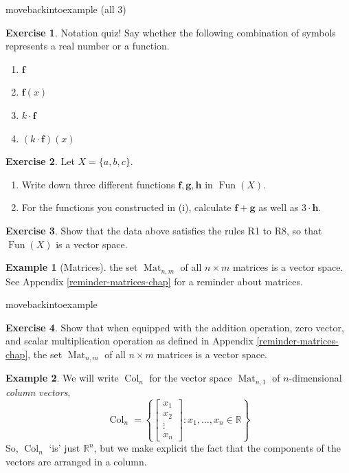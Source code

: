 \documentclass[a4paper,11pt]{book}
\theoremstyle{definition}
\newtheorem{exercise}{Exercise}
\newtheorem{example_environment}{Example}[chapter]
\newenvironment{example}
	{
		\begin{oframed} 
		\begin{example_environment}
	}
	{
		\end{example_environment}
		\end{oframed}
	}
\DeclareMathOperator{\Fun}{Fun}
\DeclareMathOperator{\Mat}{Mat}
\DeclareMathOperator{\Col}{Col}
\begin{document}
movebackintoexample (all 3)
\begin{exercise} Notation quiz! Say whether the following combination of symbols represents a real number or a function.
	\begin{enumerate}
		\item $\mathbf{f}$
		\item $\mathbf{f}(x)$
		\item $k \cdot \mathbf{f}$
		\item $(k \cdot \mathbf{f})(x)$
	\end{enumerate}
\end{exercise}

\begin{exercise} Let $X = \{a, b, c\}$. 
	\begin{enumerate}
		\item Write down three different functions $\mathbf{f}, \mathbf{g}, \mathbf{h}$ in $\Fun(X)$. 
		\item For the functions you constructed in (i), calculate $\mathbf{f} + \mathbf{g}$ as well as $3 \cdot \mathbf{h}$.
	\end{enumerate}
\end{exercise}

\begin{exercise} Show that the data above satisfies the rules R1 to R8, so that $\Fun(X)$ is a vector space.
\end{exercise}

\begin{example}[Matrices] \label{matrices_example_vec_space} the set $\Mat_{n, m}$ of all $n \times m$ matrices is a vector space. See Appendix \ref{reminder-matrices-chap} for a reminder about matrices.


\end{example}
movebackintoexample 
\begin{exercise} Show that when equipped with the addition operation, zero vector, and scalar multiplication operation as defined in Appendix \ref{reminder-matrices-chap}, the set $\Mat_{n, m}$ of all $n \times m$ matrices is a vector space. 
\end{exercise}

\begin{example} We will write $\Col_n$ for the vector space $\Mat_{n,1}$ of $n$-dimensional {\em column vectors},
\[
 \Col_n = \left\{ \left[ \begin{array}{c} x_1 \\ x_2 \\ \vdots \\ x_n \end{array} \right] : x_1, \ldots, x_n \in \mathbb{R} \right\}
\]
So, $\Col_n$ `is' just $\mathbb{R}^n$, but we make explicit the fact that the components of the vectors are arranged in a column. 
\end{example}
\end{document}
